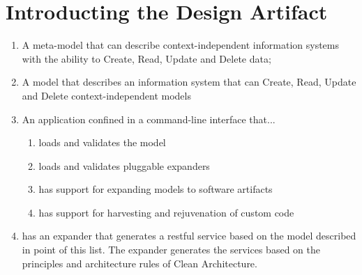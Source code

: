 \section{Introducting the Design Artifact} \label{sec:intro_artifact_design}

\renewcommand{\labelenumii}{\arabic{enumi}.\arabic{enumii}}
\renewcommand{\labelenumiii}{\arabic{enumi}.\arabic{enumii}.\arabic{enumiii}}
\renewcommand{\labelenumiv}{\arabic{enumi}.\arabic{enumii}.\arabic{enumiii}.\arabic{enumiv}}

\begin{enumerate}
    \item A meta-model that can describe context-independent information systems
    with the ability to Create, Read, Update and Delete data;
    \item A model that describes an information system that can Create, Read, Update and
    Delete context-independent models
    \item An application confined in a command-line interface that...
    \begin{enumerate}
        \item loads and validates the model 
        \item loads and validates pluggable expanders
        \item has support for expanding models to software artifacts
        \item has support for harvesting and rejuvenation of custom code
    \end{enumerate}
    \item has an expander that generates a restful service based on the model described
    in point of this list. The expander generates the services based on the principles
    and architecture rules of Clean Architecture.
    
\end{enumerate}